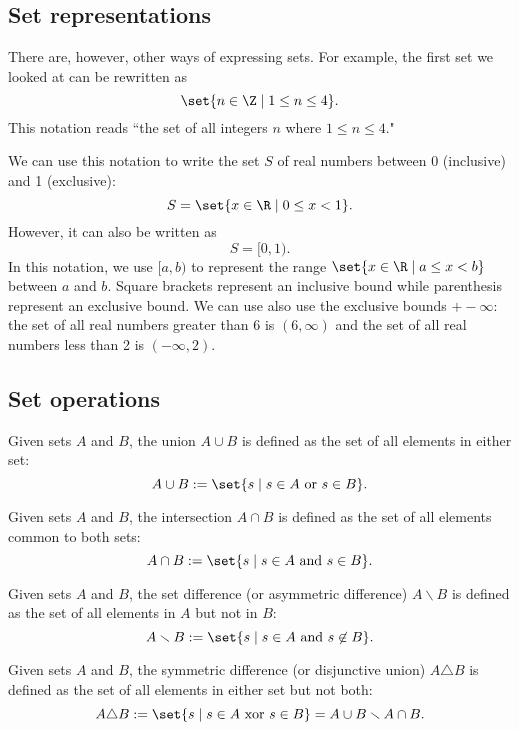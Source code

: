 \documentclass[12pt,paper=letter]{article}
\begin{document}
    \subsection{Set representations}
    There are, however,
    other ways of expressing sets.
    For example,
    the first set we looked at can be rewritten as
    \[
        \set{n\in\Z\mid 1\leq n\leq 4}.
    \]
    This notation reads ``the set of all integers $n$ where $1\leq n\leq 4$."

    We can use this notation to write the set $S$ of real numbers between 0 (inclusive) and 1 (exclusive):
    \[
        S = \set{x\in\R\mid 0\leq x<1}.
    \]
    However,
    it can also be written as
    \[
        S = [0,1).
    \]
    In this notation,
    we use $[a,b)$ to represent the range $\set{x\in\R\mid a\leq x<b}$ between $a$ and $b$.
    Square brackets represent an inclusive bound while parenthesis represent an exclusive bound.
    We can use also use the exclusive bounds $+-\infty$:
    the set of all real numbers greater than 6 is $(6,\infty)$ and the set of all real numbers less than 2 is $(-\infty,2)$.

    \subsection{Set operations}

    \begin{defboxed}
        Given sets $A$ and $B$,
        the union $A\cup B$ is defined as the set of all elements in either set:
        \[
            A\cup B := \set{s\mid s\in A \text{ or } s\in B}.
        \]
    \end{defboxed}
    \begin{defboxed}
        Given sets $A$ and $B$,
        the intersection $A\cap B$ is defined as the set of all elements common to both sets:
        \[
            A\cap B := \set{s\mid s\in A \text{ and } s\in B}.
        \]
    \end{defboxed}
    \begin{defboxed}
        Given sets $A$ and $B$,
        the set difference (or asymmetric difference) $A\smallsetminus B$ is defined as the set of all elements in $A$ but not in $B$:
        \[
            A\smallsetminus B := \set{s\mid s\in A \text{ and } s\not\in B}.
        \]
    \end{defboxed}
    \begin{defboxed}
        Given sets $A$ and $B$,
        the symmetric difference (or disjunctive union) $A\triangle B$ is defined as the set of all elements in either set but not both:
        \[
            A\triangle B := \set{s\mid s\in A \text{ xor } s\in B} = A\cup B \smallsetminus A\cap B.
        \]
    \end{defboxed}
\end{document}
